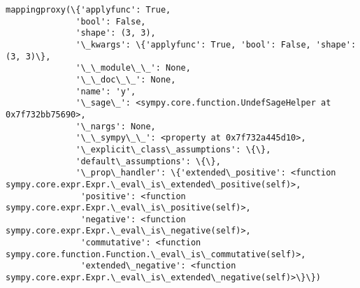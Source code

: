 \documentclass[11pt]{article}
\makeatletter
\newcommand{\boxspacing}{\kern\kvtcb@left@rule\kern\kvtcb@boxsep}
\newcommand{\prompt}[4]{
        \ttfamily\llap{{\color{#2}[#3]:\hspace{3pt}#4}}\vspace{-\baselineskip}
    }
\makeatother
\begin{document}
            \begin{tcolorbox}[breakable, size=fbox, boxrule=.5pt, pad at break*=1mm, opacityfill=0]
\prompt{Out}{outcolor}{145}{\boxspacing}
\begin{Verbatim}[commandchars=\\\{\}]
mappingproxy(\{'applyfunc': True,
              'bool': False,
              'shape': (3, 3),
              '\_kwargs': \{'applyfunc': True, 'bool': False, 'shape': (3, 3)\},
              '\_\_module\_\_': None,
              '\_\_doc\_\_': None,
              'name': 'y',
              '\_sage\_': <sympy.core.function.UndefSageHelper at 0x7f732bb75690>,
              '\_nargs': None,
              '\_\_sympy\_\_': <property at 0x7f732a445d10>,
              '\_explicit\_class\_assumptions': \{\},
              'default\_assumptions': \{\},
              '\_prop\_handler': \{'extended\_positive': <function
sympy.core.expr.Expr.\_eval\_is\_extended\_positive(self)>,
               'positive': <function
sympy.core.expr.Expr.\_eval\_is\_positive(self)>,
               'negative': <function
sympy.core.expr.Expr.\_eval\_is\_negative(self)>,
               'commutative': <function
sympy.core.function.Function.\_eval\_is\_commutative(self)>,
               'extended\_negative': <function
sympy.core.expr.Expr.\_eval\_is\_extended\_negative(self)>\}\})
\end{Verbatim}
\end{tcolorbox}
        
    \begin{tcolorbox}[breakable, size=fbox, boxrule=1pt, pad at break*=1mm,colback=cellbackground, colframe=cellborder]
\prompt{In}{incolor}{146}{\boxspacing}
\begin{Verbatim}[commandchars=\\\{\}]

\end{Verbatim}
\end{tcolorbox}

    \begin{tcolorbox}[breakable, size=fbox, boxrule=1pt, pad at break*=1mm,colback=cellbackground, colframe=cellborder]
\prompt{In}{incolor}{146}{\boxspacing}
\begin{Verbatim}[commandchars=\\\{\}]

\end{Verbatim}
\end{tcolorbox}
\end{document}
